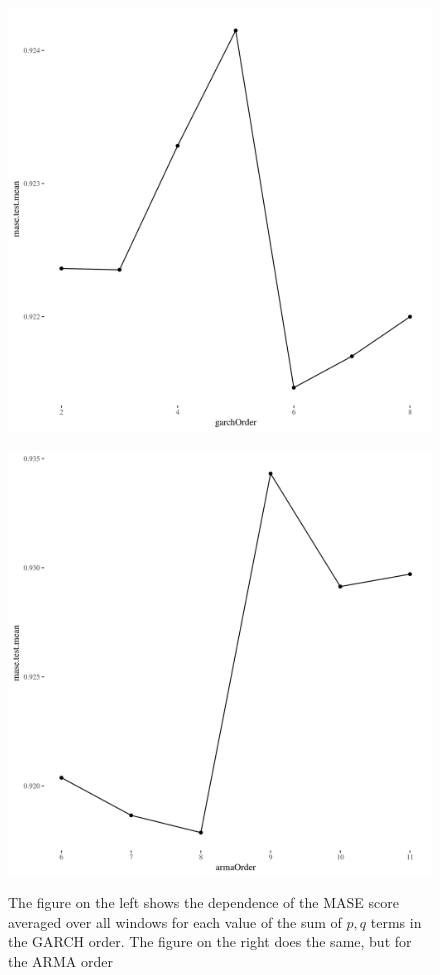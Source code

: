 \documentclass[12pt]{article}\usepackage[]{graphicx}\usepackage[]{color}
\theoremstyle{definition}
\begin{document}
\begin{figure}[h!]
\centering
\begin{minipage}{.5\textwidth}
  \centering
  \includegraphics[width=\linewidth]{garch_order.png}
  \label{fig:test1}
\end{minipage}%
\begin{minipage}{.5\textwidth}
  \centering
  \includegraphics[width=\linewidth]{arma_order.png}
  \label{fig:test2}
\end{minipage}
\caption{The figure on the left shows the dependence of the MASE score averaged over all windows for each value of the sum of $p,q$ terms in the GARCH order. The figure on the right does the same, but for the ARMA order}
\label{fig:depGarch}
\end{figure}
\doublespacing
\end{document}

